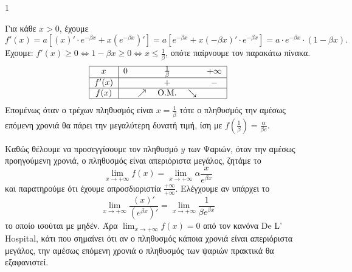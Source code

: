 \begin{ylh}{1}
    \item [ΛΥΣΗ]
\end{ylh}
\begin{alist}
    \item [α)] Για κάθε $x > 0$, έχουμε
    \[ f'(x) = a \left[(x)' \cdot e^{-\beta x} + x(e^{-\beta x})'\right] = a\left[e^{-\beta x} + x(-\beta x)' \cdot e^{-\beta x}\right] = a \cdot e^{-\beta x} \cdot (1 - \beta x). \]
    Έχουμε: $f'(x) \geq 0 \Leftrightarrow 1 - \beta x \geq 0 \Leftrightarrow x \leq \frac{1}{\beta}$, οπότε παίρνουμε τον παρακάτω πίνακα.
    \[
    \begin{tabular}{|c|ccc|}
        \hline
        $x$ & $0$ & $\frac{1}{\beta}$ & $+\infty$ \\
        \hline
        $f'(x)$ & & $+$ & $-$ \\
        \hline
        $f(x)$ & & \text{$\nearrow$} \quad \text{O.M.} \quad \text{$\searrow$} & \\
        \hline
    \end{tabular}
    \]
    Επομένως όταν ο τρέχων πληθυσμός είναι $x = \frac{1}{\beta}$ τότε ο πληθυσμός την αμέσως επόμενη χρονιά θα πάρει την μεγαλύτερη δυνατή τιμή, ίση με $f\left(\frac{1}{\beta}\right) = \frac{\alpha}{\beta e}$.

    \item [β)] Καθώς θέλουμε να προσεγγίσουμε τον πληθυσμό $y$ των Ψαριών, όταν την αμέσως προηγούμενη χρονιά, ο πληθυσμός είναι απεριόριστα μεγάλος, ζητάμε το
    \[ \lim_{x \to +\infty} f(x) = \lim_{x \to +\infty} \alpha \frac{x}{e^{\beta x}} \]
    και παρατηρούμε ότι έχουμε απροσδιοριστία $\frac{+\infty}{+\infty}$. Ελέγχουμε αν υπάρχει το
    \[ \lim_{x \to +\infty} \frac{(x)'}{(e^{\beta x})'} = \lim_{x \to +\infty} \frac{1}{\beta e^{\beta x}} \]
    το οποίο ισούται με μηδέν.
    Άρα $\lim_{x \to +\infty} f(x) = 0$ από τον κανόνα De L' Hospital, κάτι που σημαίνει ότι αν ο πληθυσμός κάποια χρονιά είναι απεριόριστα μεγάλος, την αμέσως επόμενη χρονιά ο πληθυσμός των ψαριών πρακτικά θα εξαφανιστεί.


\end{alist}
